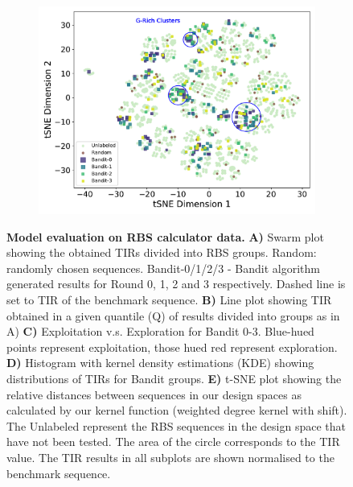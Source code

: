 \documentclass{scrartcl}[2013/05/29]%
\begin{document}
\begin{figure}[!ht]
\begin{subfigure}[b]{0.48\textwidth}
    \end{subfigure}
    \begin{subfigure}[b]{0.48\textwidth}
        \centering
        \caption{}
        \includegraphics[scale=0.42]{plots/Supplementary/tsneplot_salis.pdf}
    \end{subfigure}
    \caption{
    \textbf{Model evaluation on RBS calculator data.}
    \textbf{A)} Swarm plot showing the obtained TIRs divided into RBS groups.
    Random: randomly chosen sequences.
    Bandit-0/1/2/3 - Bandit algorithm generated results for Round 0, 1, 2 and 3 respectively.
    Dashed line is set to TIR of the benchmark sequence.
    \textbf{B)} Line plot showing TIR obtained in a given quantile (Q) of results divided into groups as in A)
    \textbf{C)} Exploitation v.s. Exploration for Bandit 0-3. Blue-hued points represent exploitation, those hued red represent exploration.
    \textbf{D)} Histogram with kernel density estimations (KDE) showing distributions of TIRs for Bandit groups.
    \textbf{E)} t-SNE plot showing the relative distances between sequences in our design spaces as calculated by our kernel function (weighted degree kernel with shift).
    The Unlabeled represent the RBS sequences in the design space that have not been tested.
    The area of the circle corresponds to the TIR value.
    The TIR results in all subplots are shown normalised to the  benchmark sequence.}
    \label{fig: Swarmplot and Quantplot Salis}
\end{figure}
\end{document}
